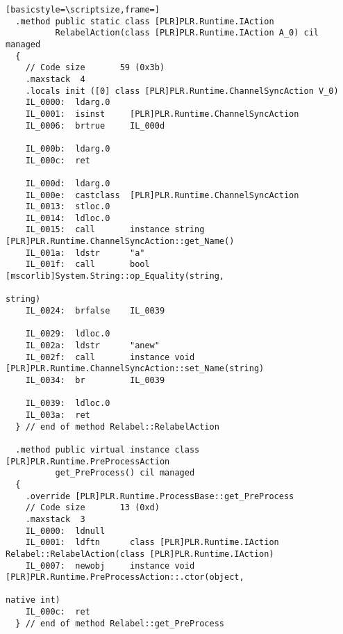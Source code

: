 \begin{lstlisting}[basicstyle=\scriptsize,frame=]
  .method public static class [PLR]PLR.Runtime.IAction 
          RelabelAction(class [PLR]PLR.Runtime.IAction A_0) cil managed
  {
    // Code size       59 (0x3b)
    .maxstack  4
    .locals init ([0] class [PLR]PLR.Runtime.ChannelSyncAction V_0)
    IL_0000:  ldarg.0
    IL_0001:  isinst     [PLR]PLR.Runtime.ChannelSyncAction
    IL_0006:  brtrue     IL_000d

    IL_000b:  ldarg.0
    IL_000c:  ret

    IL_000d:  ldarg.0
    IL_000e:  castclass  [PLR]PLR.Runtime.ChannelSyncAction
    IL_0013:  stloc.0
    IL_0014:  ldloc.0
    IL_0015:  call       instance string [PLR]PLR.Runtime.ChannelSyncAction::get_Name()
    IL_001a:  ldstr      "a"
    IL_001f:  call       bool [mscorlib]System.String::op_Equality(string,
                                                                   string)
    IL_0024:  brfalse    IL_0039

    IL_0029:  ldloc.0
    IL_002a:  ldstr      "anew"
    IL_002f:  call       instance void [PLR]PLR.Runtime.ChannelSyncAction::set_Name(string)
    IL_0034:  br         IL_0039

    IL_0039:  ldloc.0
    IL_003a:  ret
  } // end of method Relabel::RelabelAction

  .method public virtual instance class [PLR]PLR.Runtime.PreProcessAction 
          get_PreProcess() cil managed
  {
    .override [PLR]PLR.Runtime.ProcessBase::get_PreProcess
    // Code size       13 (0xd)
    .maxstack  3
    IL_0000:  ldnull
    IL_0001:  ldftn      class [PLR]PLR.Runtime.IAction Relabel::RelabelAction(class [PLR]PLR.Runtime.IAction)
    IL_0007:  newobj     instance void [PLR]PLR.Runtime.PreProcessAction::.ctor(object,
                                                                                native int)
    IL_000c:  ret
  } // end of method Relabel::get_PreProcess


\end{lstlisting}
